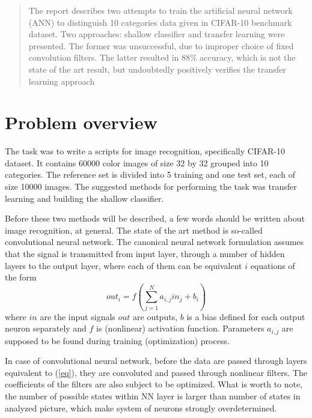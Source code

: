 \documentclass{article}
\begin{document}
\begin{abstract}
  The report describes two attempts to train
  the artificial neural network (ANN) to distinguish
  10 categories data given in CIFAR-10 benchmark dataset.
  Two approaches: shallow classifier and transfer learning were presented.
  The former was unsuccessful, due to improper choice of fixed
  convolution filters. The latter resulted in 88\% accuracy,
  which is not the state of the art result, but undoubtedly positively
  verifies the transfer learning approach
  
\end{abstract}

\section{Problem overview}

The task was to write a scripts for image recognition, specifically CIFAR-10 dataset.
It contains 60000 color images of size 32 by 32 grouped into 10 categories.
The reference set is divided into 5 training and one test set, each of size 10000
images. The suggested methods for performing the task was transfer learning and
building the shallow classifier.

Before these two methods will be described, a few words should be written about
image recognition, at general. The state of the art method is so-called
convolutional neural network. The canonical neural network formulation assumes
that  the signal is transmitted from input layer, through a number of hidden layers
to the output layer, where each of them can be equivalent $i$ equations of the form
\begin{equation}
  \label{eq}
  out_i = f \left( \sum_{j=1}^{N} a_{i,j} in_j + b_i \right)
\end{equation}
where $in$ are the input signals $out$ are outputs, $b$ is a bias
defined for each output neuron separately and $f$ is (nonlinear)
activation function. Parameters $a_{i,j}$ are supposed to be found during training
(optimization) process.

In case of convolutional neural network, before the data are passed through
layers equivalent to (\ref{eq}), they are convoluted and passed through nonlinear
filters. The coefficients of the filters are also subject to be optimized.
What is worth to note, the number of possible states
within NN layer is larger than number of states in analyzed picture, which
make system of neurons strongly overdetermined.
\end{document}
